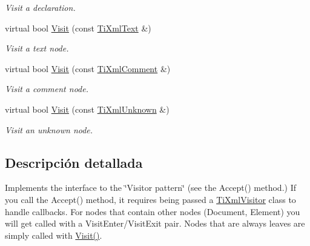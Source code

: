\begin{DoxyCompactItemize}
\begin{DoxyCompactList}\small\item\em \-Visit a declaration. \end{DoxyCompactList}\item 
\hypertarget{classTiXmlVisitor_a399b8ebca5cd14664974a32d2ce029e5}{virtual bool \hyperlink{classTiXmlVisitor_a399b8ebca5cd14664974a32d2ce029e5}{\-Visit} (const \hyperlink{classTiXmlText}{\-Ti\-Xml\-Text} \&)}\label{classTiXmlVisitor_a399b8ebca5cd14664974a32d2ce029e5}

\begin{DoxyCompactList}\small\item\em \-Visit a text node. \end{DoxyCompactList}\item 
\hypertarget{classTiXmlVisitor_a53a60e7a528627b31af3161972cc7fa2}{virtual bool \hyperlink{classTiXmlVisitor_a53a60e7a528627b31af3161972cc7fa2}{\-Visit} (const \hyperlink{classTiXmlComment}{\-Ti\-Xml\-Comment} \&)}\label{classTiXmlVisitor_a53a60e7a528627b31af3161972cc7fa2}

\begin{DoxyCompactList}\small\item\em \-Visit a comment node. \end{DoxyCompactList}\item 
\hypertarget{classTiXmlVisitor_a7e284d607d275c51dac1adb58159ce28}{virtual bool \hyperlink{classTiXmlVisitor_a7e284d607d275c51dac1adb58159ce28}{\-Visit} (const \hyperlink{classTiXmlUnknown}{\-Ti\-Xml\-Unknown} \&)}\label{classTiXmlVisitor_a7e284d607d275c51dac1adb58159ce28}

\begin{DoxyCompactList}\small\item\em \-Visit an unknown node. \end{DoxyCompactList}\end{DoxyCompactItemize}


\subsection{\-Descripción detallada}
\-Implements the interface to the \char`\"{}\-Visitor pattern\char`\"{} (see the \-Accept() method.) \-If you call the \-Accept() method, it requires being passed a \hyperlink{classTiXmlVisitor}{\-Ti\-Xml\-Visitor} class to handle callbacks. \-For nodes that contain other nodes (\-Document, \-Element) you will get called with a \-Visit\-Enter/\-Visit\-Exit pair. \-Nodes that are always leaves are simply called with \hyperlink{classTiXmlVisitor_afad71c71ce6473fb9b4b64cd92de4a19}{\-Visit()}.

